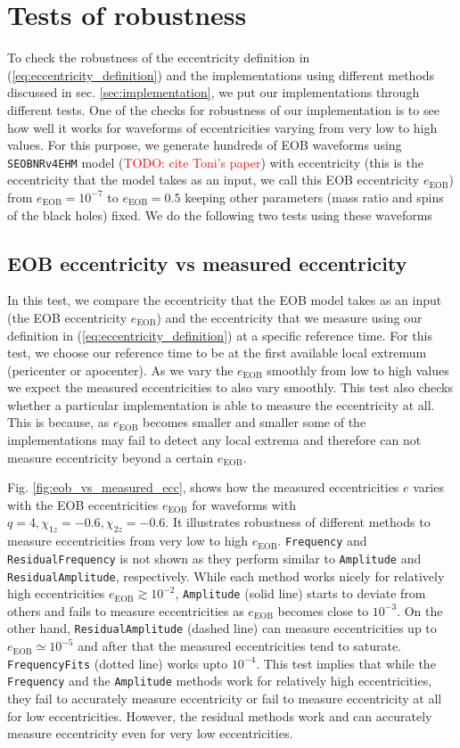 \documentclass[aps,prd,amsmath,floats,floatfix, twocolumn,
superscriptaddress,nofootinbib,showpacs]{revtex4-1}
\newcommand{\red}{\textcolor{red}}
\newcommand{\TODO}[1]{\red{TODO: #1}}
\newcommand{\eEOB}{e_{\text{EOB}}}
\newcommand{\mAmp}{\texttt{Amplitude}}
\newcommand{\mFreq}{\texttt{Frequency}}
\newcommand{\mResAmp}{\texttt{ResidualAmplitude}}
\newcommand{\mResFreq}{\texttt{ResidualFrequency}}
\newcommand{\mFreqFits}{\texttt{FrequencyFits}}
\begin{document}
\section{Tests of robustness}
\label{sec:tests}
To check the robustness of the eccentricity definition in
(\ref{eq:eccentricity_definition}) and the implementations using
different methods discussed in sec. \ref{sec:implementation}, we put
our implementations through different tests. One of the checks for
robustness of our implementation is to see how well it works for
waveforms of eccentricities varying from very low to high values. For
this purpose, we generate hundreds of EOB waveforms using
\texttt{SEOBNRv4EHM} model (\TODO{cite Toni's paper}) with
eccentricity (this is the eccentricity that the model takes as an
input, we call this EOB eccentricity $\eEOB$) from
$\eEOB = 10^{-7}$ to $\eEOB = 0.5$ keeping other
parameters (mass ratio and spins of the black holes) fixed. We do the
following two tests using these waveforms

\subsection{EOB eccentricity vs measured eccentricity}
\label{sec:eob-eccentricity-vs-measured-eccentricity} In this test, we
compare the eccentricity that the EOB model takes as an input (the EOB
eccentricity $\eEOB$) and the eccentricity that we measure
using our definition in (\ref{eq:eccentricity_definition}) at a
specific reference time. For this test, we choose our reference time
to be at the first available local extremum (pericenter or
apocenter). As we vary the $\eEOB$ smoothly from low to high
values we expect the measured eccentricities to also vary smoothly.
This test also checks whether a particular implementation is able to
measure the eccentricity at all. This is because, as $\eEOB$
becomes smaller and smaller some of the implementations may fail to
detect any local extrema and therefore can not measure eccentricity
beyond a certain $\eEOB$.

Fig. \ref{fig:eob_vs_measured_ecc}, shows how the measured
eccentricities $e$ varies with the EOB eccentricities $\eEOB$ for
waveforms with $q=4, \chi_{1z}=-0.6, \chi_{2z}=-0.6$. It illustrates
robustness of different methods to measure eccentricities from very
low to high $\eEOB$. \mFreq{} and \mResFreq{} is not shown as they
perform similar to \mAmp{} and \mResAmp{}, respectively.  While each
method works nicely for relatively high eccentricities $\eEOB \gtrsim
10^{-2}$, \mAmp{} (solid line) starts to deviate from others and fails
to measure eccentricities as $\eEOB$ becomes close to $10^{-3}$. On
the other hand, \mResAmp{} (dashed line) can measure eccentricities up
to $\eEOB \simeq 10^{-5}$ and after that the measured eccentricities
tend to saturate. \mFreqFits{} (dotted line) works upto
$10^{-4}$. This test implies that while the \mFreq{} and the \mAmp{}
methods work for relatively high eccentricities, they fail to
accurately measure eccentricity or fail to measure eccentricity at all
for low eccentricities. However, the residual methods work and can
accurately measure eccentricity even for very low eccentricities.
\end{document}
